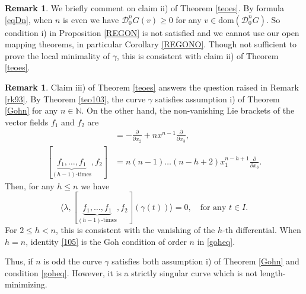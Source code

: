\documentclass[12pt, reqno]{amsart}
\theoremstyle{plain}
\theoremstyle{definition}
\newtheorem{remark}[theorem]{Remark}
\theoremstyle{remark}
\numberwithin{equation}{section}
\newcommand{\N}{\mathbb{N}}
\newcommand{\D}{\mathcal{D}}
\newcommand{\0}{\theta}
\renewcommand{\d}{\partial}
\newcommand{\g}{\gamma}
\newcommand{\la}{\lambda}
\newcommand{\1}{{-1}}
\renewcommand{\=}{\coloneqq}
\renewcommand{\.}{\dots}
\newcommand{\dom}{\mathrm{dom}}
\newcommand{\be}{\begin{equation}}
\newcommand{\ee}{\end{equation}}
\newcommand{\ddue}{\frac{\d}{\d x_2}}
\newcommand{\dtre}{\frac{\d}{\d x_3}}
\begin{document}
 
 
 
 \begin{remark} \label{R104}
  We briefly comment on claim ii) of Theorem \ref{teoes}. By formula \eqref{eqDn},  when $n$ is even  we have $\D_0^nG(v)\geq 0$  for any $v\in\dom(\D_0^nG)$. {\color{black}
  So condition i) in Proposition \ref{REGON} is not  satisfied
  and we cannot use  our open mapping theorems, in particular Corollary \ref{REGONO}.}   
  Though not sufficient to prove the local minimality of $\g$, this is consistent with claim ii) of Theorem \ref{teoes}.
 \end{remark}

 
 \begin{remark}
  Claim iii) of Theorem \ref{teoes} answers the question raised in Remark \ref{rk93}. By Theorem \ref{teo103},  the curve $\g$ satisfies assumption i) of Theorem \ref{Gohn} for any $n\in\N$.  
  On the other hand, the non-vanishing Lie brackets of the vector fields $f_1$ and $f_2$ are  
  \begin{align*}
   [f_1,f_2]&=-\ddue+nx^{n-1}\dtre,\\
   [\underbrace{f_1,\.,f_1}_\text{$(h-1)$-times},f_2]&=n(n-1)\.(n-h+2)x_1^{n-h+1}\dtre.
  \end{align*}
  Then, for any $h\leq n$ we have
  \be
   \label{105}
   \langle \la,[\underbrace{f_1,\.,f_1}_\text{$(h-1)$-times},f_2](\g(t)) \rangle=0, \quad \text{for any } t\in I.
  \ee
 For $2\leq h<n$, this  is consistent with the vanishing of the $h$-th differential.
 When $h=n$, identity \eqref{105} is the Goh condition of order $n$  in \eqref{goheq}.
  
  Thus, if $n$ is odd the curve $\g$ satisfies both assumption i) of Theorem \ref{Gohn} and condition \eqref{goheq}.
  However, it is a strictly singular curve which is not length-minimizing. 
  
 \end{remark}
 
 

  
 
	
		

   
  
\end{document}
